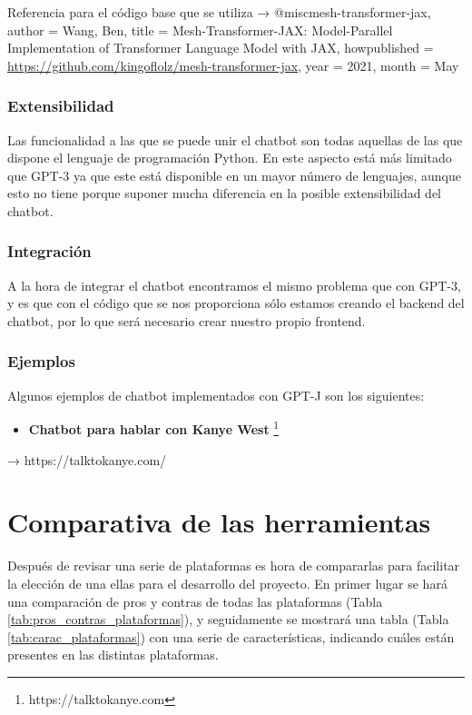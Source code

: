 Referencia para el código base que se utiliza → @misc{mesh-transformer-jax,
  author = {Wang, Ben},
  title = {{Mesh-Transformer-JAX: Model-Parallel Implementation of Transformer Language Model with JAX}},
  howpublished = {\url{https://github.com/kingoflolz/mesh-transformer-jax}},
  year = 2021,
  month = May
}


\subsubsection*{Extensibilidad}

Las funcionalidad a las que se puede unir el chatbot son todas aquellas de las que dispone el lenguaje de programación Python. En este aspecto está más limitado que GPT-3 ya que este está disponible en un mayor número de lenguajes, aunque esto no tiene porque suponer mucha diferencia en la posible extensibilidad del chatbot.

\subsubsection*{Integración}

A la hora de integrar el chatbot encontramos el mismo problema que con GPT-3, y es que con el código que se nos proporciona sólo estamos creando el backend del chatbot, por lo que será necesario crear nuestro propio frontend.

\subsubsection*{Ejemplos}

Algunos ejemplos de chatbot implementados con GPT-J son los siguientes:

\begin{itemize}
    \item \textbf{Chatbot para hablar con Kanye West} \footnote{https://talktokanye.com}
\end{itemize}



→ https://talktokanye.com/


\section{Comparativa de las herramientas}

Después de revisar una serie de plataformas es hora de compararlas para facilitar la elección de una ellas para el desarrollo del proyecto. En primer lugar se hará una comparación de pros y contras de todas las plataformas (Tabla \ref{tab:pros_contras_plataformas}), y seguidamente se mostrará una tabla (Tabla \ref{tab:carac_plataformas}) con una serie de características, indicando cuáles están presentes en las distintas plataformas.


